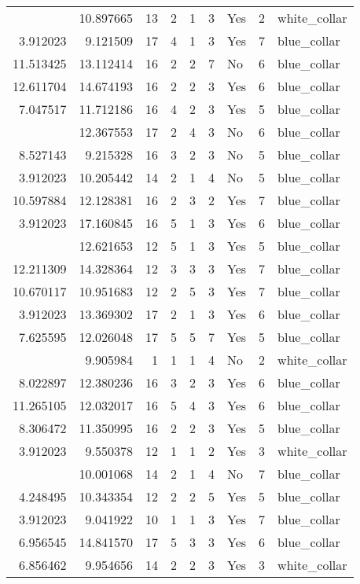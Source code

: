 \documentclass[
]{article}
\begin{document}
\begin{longtable}[t]{rrrrrllrl}
\addlinespace
3.912023 & 10.897665 & 13 & 2 & 1 & 3 & Yes & 2 & white\_collar\\
3.912023 & 9.121509 & 17 & 4 & 1 & 3 & Yes & 7 & blue\_collar\\
11.513425 & 13.112414 & 16 & 2 & 2 & 7 & No & 6 & blue\_collar\\
12.611704 & 14.674193 & 16 & 2 & 2 & 3 & Yes & 6 & blue\_collar\\
7.047517 & 11.712186 & 16 & 4 & 2 & 3 & Yes & 5 & blue\_collar\\
\addlinespace
9.743906 & 12.367553 & 17 & 2 & 4 & 3 & No & 6 & blue\_collar\\
8.527143 & 9.215328 & 16 & 3 & 2 & 3 & No & 5 & blue\_collar\\
3.912023 & 10.205442 & 14 & 2 & 1 & 4 & No & 5 & blue\_collar\\
10.597884 & 12.128381 & 16 & 2 & 3 & 2 & Yes & 7 & blue\_collar\\
3.912023 & 17.160845 & 16 & 5 & 1 & 3 & Yes & 6 & blue\_collar\\
\addlinespace
3.912023 & 12.621653 & 12 & 5 & 1 & 3 & Yes & 5 & blue\_collar\\
12.211309 & 14.328364 & 12 & 3 & 3 & 3 & Yes & 7 & blue\_collar\\
10.670117 & 10.951683 & 12 & 2 & 5 & 3 & Yes & 7 & blue\_collar\\
3.912023 & 13.369302 & 17 & 2 & 1 & 3 & Yes & 6 & blue\_collar\\
7.625595 & 12.026048 & 17 & 5 & 5 & 7 & Yes & 5 & blue\_collar\\
\addlinespace
3.912023 & 9.905984 & 1 & 1 & 1 & 4 & No & 2 & white\_collar\\
8.022897 & 12.380236 & 16 & 3 & 2 & 3 & Yes & 6 & blue\_collar\\
11.265105 & 12.032017 & 16 & 5 & 4 & 3 & Yes & 6 & blue\_collar\\
8.306472 & 11.350995 & 16 & 2 & 2 & 3 & Yes & 5 & blue\_collar\\
3.912023 & 9.550378 & 12 & 1 & 1 & 2 & Yes & 3 & white\_collar\\
\addlinespace
3.912023 & 10.001068 & 14 & 2 & 1 & 4 & No & 7 & blue\_collar\\
4.248495 & 10.343354 & 12 & 2 & 2 & 5 & Yes & 5 & blue\_collar\\
3.912023 & 9.041922 & 10 & 1 & 1 & 3 & Yes & 7 & blue\_collar\\
6.956545 & 14.841570 & 17 & 5 & 3 & 3 & Yes & 6 & blue\_collar\\
6.856462 & 9.954656 & 14 & 2 & 2 & 3 & Yes & 3 & white\_collar\\

\end{longtable}
\end{document}
